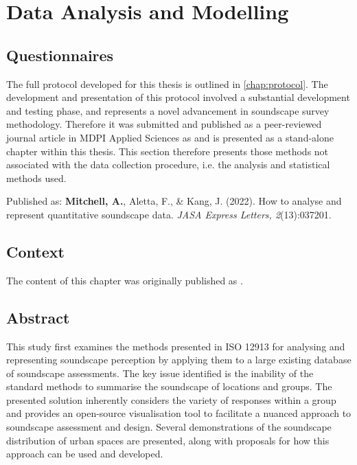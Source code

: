 \chapter{Data Analysis and Modelling}
\label{chap:methods}





\section{Questionnaires}

 The full protocol developed for this thesis is outlined in \cref{chap:protocol}. The development and presentation of this protocol involved a substantial development and testing phase, and represents a novel advancement in soundscape survey methodology. Therefore it was submitted and published as a peer-reviewed journal article in MDPI Applied Sciences as \citet{Mitchell2020Soundscape} and is presented as a stand-alone chapter within this thesis. This section therefore presents those methods not associated with the data collection procedure, i.e. the analysis and statistical methods used.

 Published as: \textbf{Mitchell, A.}, Aletta, F., \& Kang, J. (2022). How to analyse and represent quantitative soundscape data. \emph{JASA Express Letters, 2}(13):037201.

\section*{Context}
The content of this chapter was originally published as \citet{Mitchell2022How}.

\section{Abstract}
This study first examines the methods presented in ISO 12913 for analysing and representing soundscape perception by applying them to a large existing database of soundscape assessments. The key issue identified is the inability of the standard methods to summarise the soundscape of locations and groups. The presented solution inherently considers the variety of responses within a group and provides an open-source visualisation tool to facilitate a nuanced approach to soundscape assessment and design. Several demonstrations of the soundscape distribution of urban spaces are presented, along with proposals for how this approach can be used and developed.

